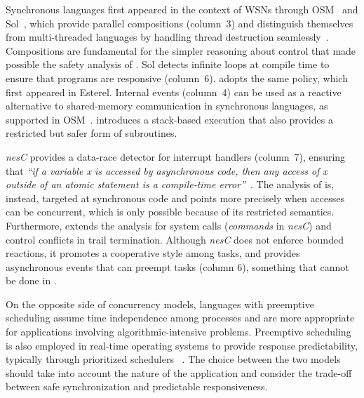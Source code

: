 Synchronous languages first appeared in the context of WSNs through 
OSM~\cite{wsn.osm} and Sol~\cite{wsn.sol}, which provide parallel compositions 
(column~3) and distinguish themselves from multi-threaded languages by handling 
thread destruction seamlessly~\cite{sync_async.threadsstop,esterel.preemption}.
Compositions are fundamental for the simpler reasoning about control that made 
possible the safety analysis of \CEU.
%
Sol detects infinite loops at compile time to ensure that programs are 
responsive (column~6).
\CEU adopts the same policy, which first appeared in Esterel.
%
Internal events (column~4) can be used as a reactive alternative to 
shared-memory communication in synchronous languages, as supported in 
OSM~\cite{wsn.osm}.
\CEU introduces a stack-based execution that also provides a restricted but 
safer form of subroutines.

\emph{nesC} provides a data-race detector for interrupt handlers (column~7), 
ensuring that \emph{``if a variable x is accessed by asynchronous code, then 
any access of x outside of an atomic statement is a compile-time 
error''}~\cite{wsn.nesc}.
The analysis of \CEU is, instead, targeted at synchronous code and points more 
precisely when accesses can be concurrent, which is only possible because of 
its restricted semantics.
Furthermore, \CEU extends the analysis for system calls (\emph{commands} in 
\emph{nesC}) and control conflicts in trail termination.
Although \emph{nesC} does not enforce bounded reactions, it promotes a 
cooperative style among tasks, and provides asynchronous events that can 
preempt tasks (column 6), something that cannot be done in \CEU.

On the opposite side of concurrency models, languages with preemptive 
scheduling assume time independence among processes and are more appropriate 
for applications involving algorithmic-intensive problems.
%
Preemptive scheduling is also employed in real-time operating systems to 
provide response predictability, typically through prioritized schedulers
~\cite{wsn.mantisos,wsn.oses,freertos,wsn.tosthreads}.
%
The choice between the two models should take into account the nature of the 
application and consider the trade-off between safe synchronization and 
predictable responsiveness.
